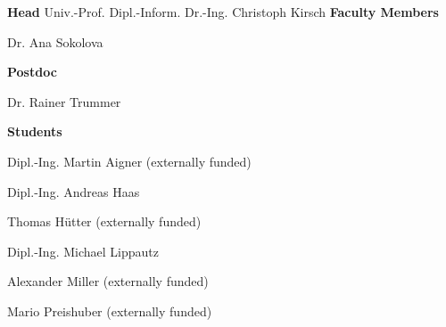 \textcolor{\workinggroupboxtextcolor}{
	\textbf{Head}
	\newline
    \newline
	Univ.-Prof. Dipl.-Inform. Dr.-Ing. Christoph Kirsch
	\newline
    \newline
	\textbf{Faculty Members}
	\begin{compactitem}
	  \item Dr. Ana Sokolova
	\end{compactitem}
	\vspace{0.5cm}
	\textbf{Postdoc}
	\begin{compactitem}
		\item Dr. Rainer Trummer
	\end{compactitem}
	\vspace{0.5cm}
	\textbf{Students}
	\begin{compactitem}
	  \item Dipl.-Ing. Martin Aigner (externally funded)
	  \item Dipl.-Ing. Andreas Haas
	  \item Thomas Hütter (externally funded)
	  \item Dipl.-Ing. Michael Lippautz
	  \item Alexander Miller (externally funded)
	  \item Mario Preishuber (externally funded)
	\end{compactitem}
} 